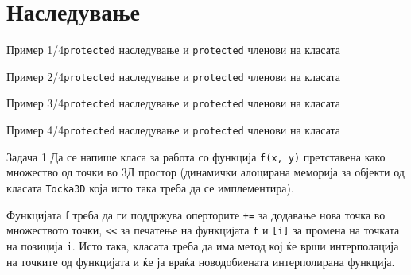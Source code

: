 \section{Наследување}

\begin{frame}{Пример 1/4}{\texttt{protected} наследување и \texttt{protected} членови на
класата}

\end{frame}

\begin{frame}[fragile]{Пример 2/4}{\texttt{protected} наследување и \texttt{protected} членови на
класата}

\end{frame}

\begin{frame}[fragile]{Пример 3/4}{\texttt{protected} наследување и
\texttt{protected} членови на класата}

\end{frame}

\begin{frame}[fragile]{Пример 4/4}{\texttt{protected} наследување и
\texttt{protected} членови на класата}

\end{frame}

\begin{frame}{Задача 1}
Да се напише класа за работа со функција \texttt{f(x, y)} претставена како множество од
точки во 3Д простор (динамички алоцирана меморија за објекти од класата \texttt{Tocka3D}
која исто така треба да се имплементира). 

Функцијата f треба да  ги поддржува оперторите \texttt{+=} за додавање нова точка во
множеството точки, \texttt{<<}  за печатење на функцијата \texttt{f} и \texttt{[i]}  за промена  на 
точката  на  позиција \texttt{i}. Исто така, класата треба  да  има  метод 
кој ќе врши интерполација на точките од функцијата и ќе ја враќа новодобиената  
интерполирана функција.

\end{frame}

